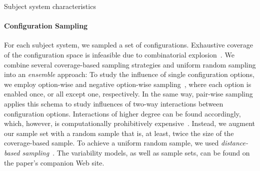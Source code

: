 \begin{table}[ht!]
		\centering
		\caption{Subject system characteristics}
		
		\label{tab:subject_systems}
	\end{table}

\paragraph*{Configuration Sampling}\label{sec:sampling}
For each subject system, we sampled a set of configurations. Exhaustive coverage of the configuration space is infeasible due to combinatorial explosion~\cite{henardCombining2015}. We combine several coverage-based sampling strategies and uniform random sampling into an \emph{ensemble} approach: To study the influence of single configuration options, we employ option-wise and negative option-wise sampling~\cite{siegmundPerformanceinfluenceModelsHighly2015}, where each option is enabled once, or all except one, respectively. In the same way, pair-wise sampling applies this schema to study influences of two-way interactions between configuration options. Interactions of higher degree can be found accordingly, which, however, is computationally prohibitively expensive~\cite{henardCombining2015}. Instead, we augment our sample set with a random sample that is, at least, twice the size of the coverage-based sample. To achieve a uniform random sample, we used \emph{distance-based sampling}~\cite{kaltenecker_distance-based_2019}. The variability models, as well as sample sets, can be found on the paper's companion Web site.
	
